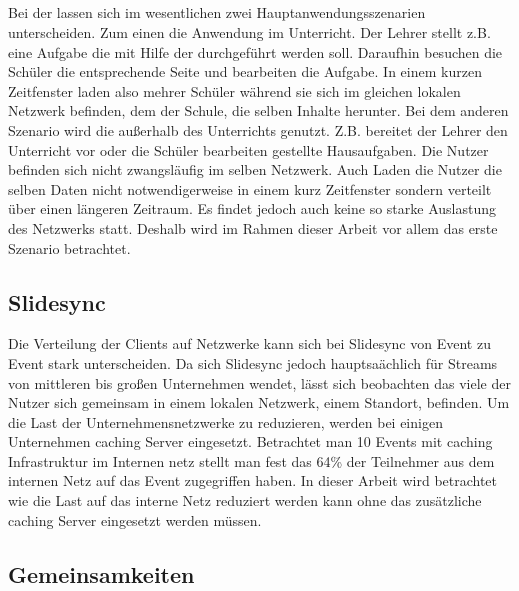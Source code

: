 \subsection{\schulCloud}
Bei der \schulCloud lassen sich im wesentlichen zwei Hauptanwendungsszenarien unterscheiden. Zum einen die Anwendung im Unterricht. Der Lehrer stellt z.B. eine Aufgabe die mit Hilfe der \schulCloud durchgeführt werden soll. Daraufhin besuchen die Schüler die entsprechende Seite und bearbeiten die Aufgabe. In einem kurzen Zeitfenster laden also mehrer Schüler während sie sich im gleichen lokalen Netzwerk befinden, dem der Schule, die selben Inhalte herunter. Bei dem anderen Szenario wird die \schulCloud außerhalb des Unterrichts genutzt. Z.B. bereitet der Lehrer den Unterricht vor oder die Schüler bearbeiten gestellte Hausaufgaben. Die Nutzer befinden sich nicht zwangsläufig im selben Netzwerk. Auch Laden die Nutzer die selben Daten nicht notwendigerweise in einem kurz Zeitfenster sondern verteilt über einen längeren Zeitraum. Es findet jedoch auch keine so starke Auslastung des Netzwerks statt. Deshalb wird im Rahmen dieser Arbeit vor allem das erste Szenario betrachtet.

\subsection{Slidesync}
Die Verteilung der Clients auf Netzwerke kann sich bei Slidesync von Event zu Event stark unterscheiden. Da sich Slidesync jedoch hauptsaächlich für Streams von mittleren bis großen Unternehmen wendet, lässt sich beobachten das viele der Nutzer sich gemeinsam in einem lokalen Netzwerk, einem Standort, befinden. Um die Last der Unternehmensnetzwerke zu reduzieren, werden bei einigen Unternehmen caching Server eingesetzt. Betrachtet man 10 Events mit caching Infrastruktur im Internen netz stellt man fest das 64\% der Teilnehmer aus dem internen Netz auf das Event zugegriffen haben. In dieser Arbeit wird betrachtet wie die Last auf das interne Netz reduziert werden kann ohne das zusätzliche caching Server eingesetzt werden müssen.

\subsection{Gemeinsamkeiten}

